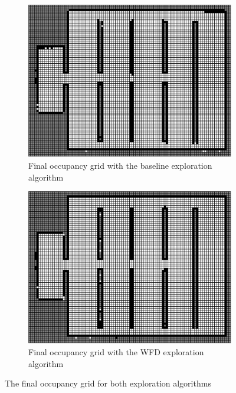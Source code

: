 \documentclass[a4paper,12pt]{article}
\begin{document}
		\begin{figure}[H]
			\centering
			\begin{subfigure}{.5\textwidth}
				\centering
				\includegraphics[width=.9\linewidth]{images/finalMap_task3_baseline_TSF2.eps}
				\caption{Final occupancy grid with the baseline exploration algorithm}
				\label{finalMap_task3_baseline_TSF2}
			\end{subfigure}%
			\begin{subfigure}{.5\textwidth}
				\centering
				\includegraphics[width=.9\linewidth]{images/finalMap_task3_WFD_TSF2.eps}
				\caption{Final occupancy grid with the WFD exploration algorithm}
				\label{finalMap_task3_WFD_TSF2}
			\end{subfigure}
			\caption{The final occupancy grid for both exploration algorithms}
			\label{finalMap}
		\end{figure}
\end{document}

